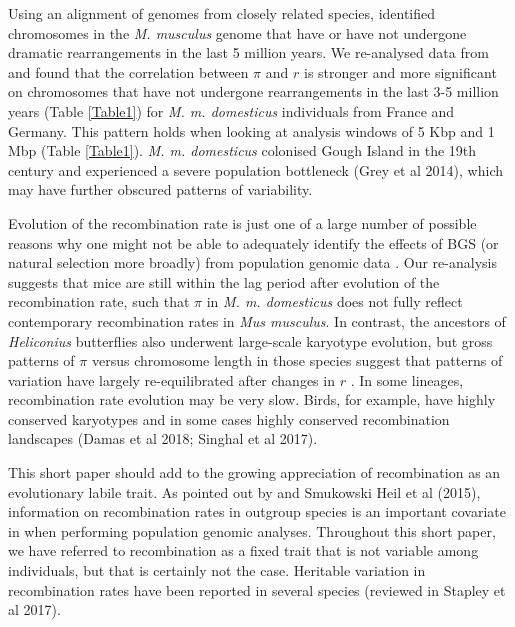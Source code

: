 \documentclass[11pt,twoside, onecolumn]{GSA_format}
\begin{document}
Using an alignment of genomes from closely related species, \cite{Thybert2018} identified chromosomes in the \textit{M. musculus} genome that have or have not undergone dramatic rearrangements in the last 5 million years. We re-analysed data from \cite{Kartje2020} and found that the correlation between $\pi$ and $r$ is stronger and more significant on chromosomes that have not undergone rearrangements in the last 3-5 million years (Table \ref{Table1}) for \textit{M. m. domesticus} individuals from France and Germany. This pattern holds when looking at analysis windows of 5 Kbp and 1 Mbp (Table \ref{Table1}). \textit{M. m. domesticus} colonised Gough Island in the 19th century and experienced a severe population bottleneck (Grey et al 2014), which may have further obscured patterns of variability. 

\vspace{5px}

Evolution of the recombination rate is just one of a large number of possible reasons why one might not be able to adequately identify the effects of BGS (or natural selection more broadly) from population genomic data \citep{Comeron2017-jc}. Our re-analysis suggests that mice are still within the lag period after evolution of the recombination rate, such that $\pi$ in \textit{M. m. domesticus} does not fully reflect contemporary recombination rates in \textit{Mus musculus}. In contrast, the ancestors of \textit{Heliconius} butterflies also underwent large-scale karyotype evolution, but gross patterns of $\pi$ versus chromosome length in those species suggest that patterns of variation have largely re-equilibrated after changes in $r$ \citep{Cicconardi2021}. In some lineages, recombination rate evolution may be very slow. Birds, for example, have highly conserved karyotypes and in some cases highly conserved recombination landscapes (Damas et al 2018; Singhal et al 2017). 

\vspace{5px}

This short paper should add to the growing appreciation of recombination as an evolutionary labile trait. As pointed out by \cite{Comeron2017-jc} and Smukowski Heil et al (2015), information on recombination rates in outgroup species is an important covariate in 
when performing population genomic analyses. Throughout this short paper, we have referred to recombination as a fixed trait that is not variable among individuals, but that is certainly not the case. Heritable variation in recombination rates have been reported in several species (reviewed in Stapley et al 2017).
\end{document}
